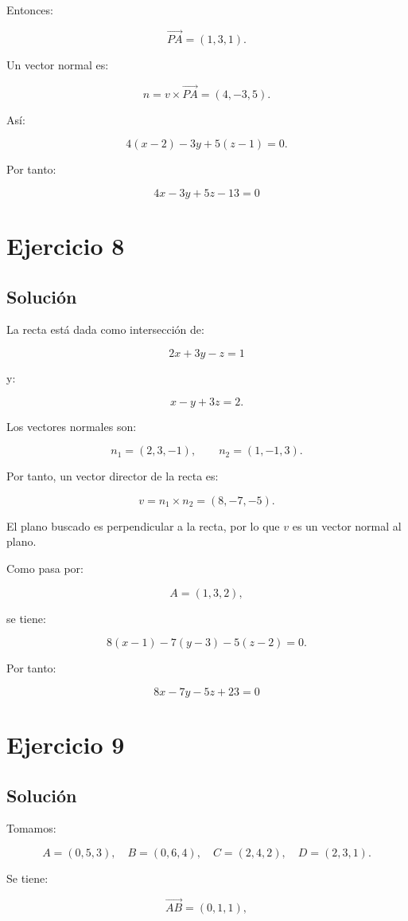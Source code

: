 \documentclass[11pt,a4paper]{article}
\begin{document}
Entonces:

\[
\overrightarrow{PA}
=
(1,3,1).
\]

Un vector normal es:

\[
n
=
v\times\overrightarrow{PA}
=
(4,-3,5).
\]

Así:

\[
4(x-2)-3y+5(z-1)=0.
\]

Por tanto:

\[
\boxed{
4x-3y+5z-13=0
}
\]

\section{Ejercicio 8}
\subsection{Solución}

La recta está dada como intersección de:

\[
2x+3y-z=1
\]

y:

\[
x-y+3z=2.
\]

Los vectores normales son:

\[
n_1=(2,3,-1),
\qquad
n_2=(1,-1,3).
\]

Por tanto, un vector director de la recta es:

\[
v
=
n_1\times n_2
=
(8,-7,-5).
\]

El plano buscado es perpendicular a la recta, por lo que \(v\) es un vector normal al plano.

Como pasa por:

\[
A=(1,3,2),
\]

se tiene:

\[
8(x-1)-7(y-3)-5(z-2)=0.
\]

Por tanto:

\[
\boxed{
8x-7y-5z+23=0
}
\]

\section{Ejercicio 9}
\subsection{Solución}

Tomamos:

\[
A=(0,5,3),
\quad
B=(0,6,4),
\quad
C=(2,4,2),
\quad
D=(2,3,1).
\]

Se tiene:

\[
\overrightarrow{AB}=(0,1,1),
\]
\end{document}
